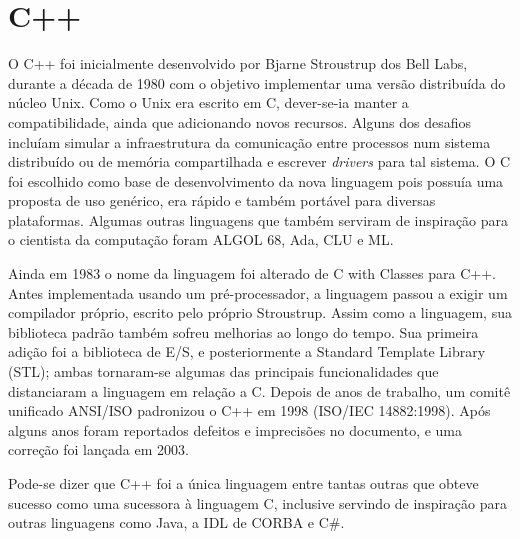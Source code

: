 \documentclass[
    12pt,               %
    openany,            %
    twoside,            %
    a4paper,            %
    brazil              %
    ]{abntex2}
\begin{document}
\chapter{C++}

O C++ foi inicialmente desenvolvido por Bjarne Stroustrup dos Bell Labs,
durante a década de 1980 com o objetivo implementar uma versão distribuída do
núcleo Unix. Como o Unix era escrito em C, dever-se-ia manter a
compatibilidade, ainda que adicionando novos recursos. Alguns dos desafios
incluíam simular a infraestrutura da comunicação entre processos num sistema
distribuído ou de memória compartilhada e escrever \textit{drivers} para tal
sistema. O C foi escolhido como base de desenvolvimento da nova linguagem pois
possuía uma proposta de uso genérico, era rápido e também portável para
diversas plataformas. Algumas outras linguagens que também serviram de
inspiração para o cientista da computação foram ALGOL 68, Ada, CLU e ML.

Ainda em 1983 o nome da linguagem foi alterado de C with Classes para C++.
Antes implementada usando um pré-processador, a linguagem passou a exigir um
compilador próprio, escrito pelo próprio Stroustrup. Assim como a linguagem,
sua biblioteca padrão também sofreu melhorias ao longo do tempo. Sua primeira
adição foi a biblioteca de E/S, e posteriormente a Standard Template Library
(STL); ambas tornaram-se algumas das principais funcionalidades que
distanciaram a linguagem em relação a C.  Depois de anos de trabalho, um comitê
unificado ANSI/ISO padronizou o C++ em 1998 (ISO/IEC 14882:1998). Após alguns
anos foram reportados defeitos e imprecisões no documento, e uma correção foi
lançada em 2003.

Pode-se dizer que C++ foi a única linguagem entre tantas outras que obteve
sucesso como uma sucessora à linguagem C, inclusive servindo de inspiração para
outras linguagens como Java, a IDL de CORBA e C\#.


\end{document}
